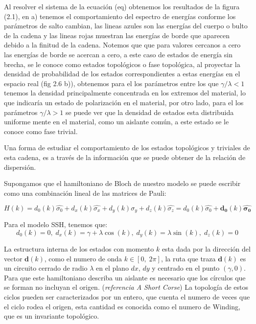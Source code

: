 Al resolver el sistema de la ecuación (eq) obtenemos los resultados de la figura (2.1), en a) tenemos el comportamiento del espectro de energías conforme los parámetros de salto cambian, las lineas azules son las energías del cuerpo o bulto de la cadena y las lineas rojas muestran las energías de borde que aparecen debido a la finitud de la cadena. Notemos que que para valores cercanos a cero las energías de borde se acercan a cero, a este caso de estados de energía sin brecha, se le conoce como estados topológicos o fase topológica, al proyectar la densidad de probabilidad de los estados correspondientes a estas energías en el espacio real (fig 2.6 b)), obtenemos para el los parámetros entre los que $\gamma/\lambda < 1$ tenemos la densidad principalmente concentrada en los extremos del material, lo que indicaría un estado de polarización en el material, por otro lado, para el los parámetros $\gamma/\lambda > 1$ se puede ver que la densidad de estados esta distribuida uniforme mente en el material, como un aislante común, a este estado se le conoce como fase trivial.

Una forma de estudiar el comportamiento de los estados topológicos y triviales de esta cadena, es a través de la información que se puede obtener de la relación de dispersión. 

Supongamos que el hamiltoniano de Bloch de nuestro modelo se puede escribir como una combinación lineal de las matrices de Pauli:

\begin{equation}
    H(k) = d_0(k) \hat{\sigma_0} + d_x(k) \hat{\sigma_x} + d_y(k) \hat{\sigma_y} + d_z(k) \hat{\sigma_z} = d_0(k) \hat{\sigma_0} + \mathbf{d_0}(k) \mathbf{\hat{\sigma_0}}
\end{equation}

Para el modelo SSH, tenemos que:
\begin{equation}
  d_0(k) = 0 ,\; d_x(k) = \gamma + \lambda \cos(k) , \; d_y(k) = \lambda \sin(k), \; d_z(k) = 0  
\end{equation}

La estructura interna de los estados con momento $k$ esta dada por la dirección del vector $\mathbf{d}(k)$, como el numero de onda $k  \in \left[ 0, \; 2\pi \right]$, la ruta que traza $\mathbf{d}(k)$ es un circuito cerrado de radio $\lambda$ en el plano $dx, \,dy$ y centrado en el punto $(\gamma, 0)$. Para que este hamiltoniano describa un aislante es necesario que los círculos que se forman no incluyan el origen. (\textit{referencia A Short Corse}) La topología de estos ciclos pueden ser caracterizados por un entero, que cuenta el numero de veces que el ciclo rodea el origen, esta cantidad es conocida como el numero de Winding, que es un invariante topológico.

